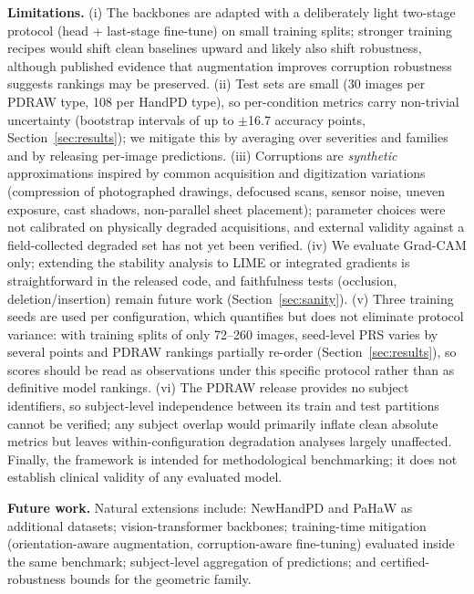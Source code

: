 \documentclass[11pt,a4paper]{article}
\begin{document}
\textbf{Limitations.} (i) The backbones are adapted with a deliberately light
two-stage protocol (head + last-stage fine-tune) on small training splits;
stronger training recipes would shift clean baselines upward and likely also
shift robustness, although published evidence that augmentation improves
corruption robustness \cite{boone2023} suggests rankings may be preserved.
(ii) Test sets are small (30 images per PDRAW type, 108 per HandPD type), so
per-condition metrics carry non-trivial uncertainty (bootstrap intervals of
up to $\pm$16.7 accuracy points, Section~\ref{sec:results}); we mitigate this
by averaging over severities and families and by releasing per-image
predictions. (iii) Corruptions are \emph{synthetic} approximations inspired
by common acquisition and digitization variations (compression of
photographed drawings, defocused scans, sensor noise, uneven exposure, cast
shadows, non-parallel sheet placement); parameter choices were not calibrated on physically degraded
acquisitions, and external validity against a field-collected degraded set
has not yet been verified. (iv) We evaluate Grad-CAM only; extending the
stability analysis to LIME or integrated gradients is straightforward in the
released code, and faithfulness tests (occlusion, deletion/insertion) remain
future work (Section~\ref{sec:sanity}). (v) Three training seeds are used
per configuration, which quantifies but does not eliminate protocol
variance: with training splits of only 72--260 images, seed-level PRS
varies by several points and PDRAW rankings partially re-order
(Section~\ref{sec:results}), so scores should be read as observations
under this specific protocol rather than as definitive model rankings. (vi) The PDRAW release
provides no subject identifiers, so subject-level independence between its
train and test partitions cannot be verified; any subject overlap would
primarily inflate clean absolute metrics but leaves within-configuration
degradation analyses largely unaffected. Finally, the framework is intended
for methodological benchmarking; it does not establish clinical validity of
any evaluated model.

\textbf{Future work.} Natural extensions include: NewHandPD and PaHaW as
additional datasets; vision-transformer backbones; training-time mitigation
(orientation-aware augmentation, corruption-aware fine-tuning) evaluated
inside the same benchmark; subject-level aggregation of predictions; and
certified-robustness bounds for the geometric family.
\end{document}
